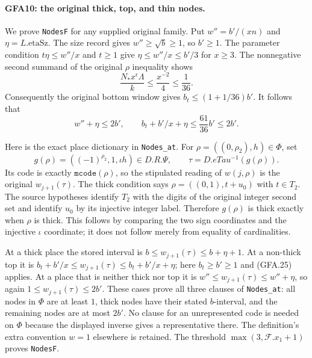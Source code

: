 \paragraph{GFA10: the original thick, top, and thin nodes.}
\label{claim:GFA10}
We prove \texttt{NodesF} for any supplied original family.
Put $w''=b'/(xn)$ and $\eta=L.\mathrm{etaSz}$.
The size record gives $w''\ge\sqrt b\ge1$, so $b'\ge1$.
The parameter condition $t\eta\le w''/x$ and $t\ge1$ give
$\eta\le w''/x\le b'/3$ for $x\ge3$.
The nonnegative second summand of the original $\rho$ inequality
shows
\[
 \frac{N_*x^\epsilon\Lambda}{k}\le\frac{x^{-2}}4\le\frac1{36}.
\]
Consequently the original bottom window gives
$b_t\le(1+1/36)b'$.  It follows that
\[
 w''+\eta\le2b',\qquad
 b_t+b'/x+\eta\le\frac{61}{36}b'\le2b'.                     \tag{GFA.25}
\]

Here is the exact place dictionary in \texttt{Nodes\_at}.
For $\rho=((0,\rho_2),h)\in\Phi$, set
\[
 g(\rho)=((-1)^{\rho_2},1,\iota h)\in D.R.\Psi,
 \qquad \tau=D.eTau^{-1}(g(\rho)).
\]
Its code is exactly $\texttt{mcode}(\rho)$, so the stipulated
reading of $w(j,\rho)$ is the original $w_{j+1}(\tau)$.
The thick condition says $\rho=((0,1),t+u_0)$ with
$t\in T_2$.  The source hypotheses identify $T_2$ with the
digits of the original integer second set and identify $u_0$
by its injective integer label.  Therefore $g(\rho)$ is thick
exactly when $\rho$ is thick.  This follows by comparing the
two sign coordinates and the injective $\iota$ coordinate;
it does not follow merely from equality of cardinalities.

At a thick place the stored interval is
$b\le w_{j+1}(\tau)\le b+\eta+1$.
At a non-thick top it is
$b_t+b'/x\le w_{j+1}(\tau)\le b_t+b'/x+\eta$;
here $b_t\ge b'\ge1$ and (GFA.25) applies.
At a place that is neither thick nor top it is
$w''\le w_{j+1}(\tau)\le w''+\eta$, so again
$1\le w_{j+1}(\tau)\le2b'$.
These cases prove all three clauses of \texttt{Nodes\_at}:
all nodes in $\Phi$ are at least $1$, thick nodes have their
stated $b$-interval, and the remaining nodes are at most $2b'$.
No clause for an unrepresented code is needed on $\Phi$ because
the displayed inverse gives a representative there.  The
definition's extra convention $w=1$ elsewhere is retained.
The threshold $\max(3,\mathcal F.x_1+1)$ proves
\texttt{NodesF}.

